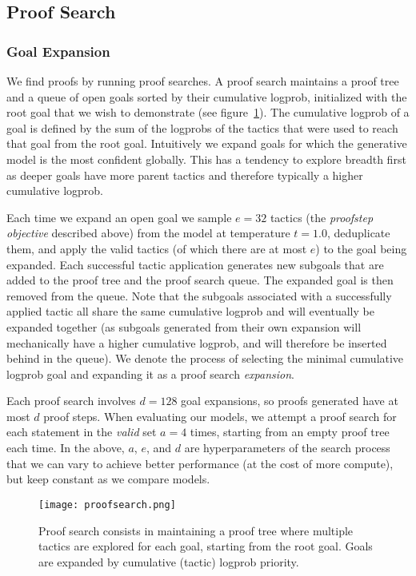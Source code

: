 \documentclass{article}
\begin{document}
\subsection{Proof Search}

\subsubsection{Goal Expansion}
We find proofs by running proof searches. A proof search maintains a proof tree and a queue of open goals sorted by their cumulative logprob, initialized with the root goal that we wish to demonstrate (see figure~\ref{fig:proofsearch}). The cumulative logprob of a goal is defined by the sum of the logprobs of the tactics that were used to reach that goal from the root goal. Intuitively we expand goals for which the generative model is the most confident globally. This has a tendency to explore breadth first as deeper goals have more parent tactics and therefore typically a higher cumulative logprob.

Each time we expand an open goal we sample $e=32$ tactics (the \textit{proofstep objective} described above) from the model at temperature $t=1.0$, deduplicate them, and apply the valid tactics (of which there are at most $e$) to the goal being expanded. Each successful tactic application generates new subgoals that are added to the proof tree and the proof search queue. The expanded goal is then removed from the queue. Note that the subgoals associated with a successfully applied tactic all share the same cumulative logprob and will eventually be expanded together (as subgoals generated from their own expansion will mechanically have a higher cumulative logprob, and will therefore be inserted behind in the queue). We denote the process of selecting the minimal cumulative logprob goal and expanding it as a proof search \textit{expansion}. 

Each proof search involves $d=128$ goal expansions, so proofs generated have at most $d$ proof steps. When evaluating our models, we attempt a proof search for each statement in the \textit{valid} set $a=4$ times, starting from an empty proof tree each time. In the above, $a$, $e$, and $d$ are hyperparameters of the search process that we can vary to achieve better performance (at the cost of more compute), but keep constant as we compare models.

\begin{figure}
    \texttt{[image: proofsearch.png]}
    \caption{Proof search consists in maintaining a proof tree where multiple tactics are explored for each goal, starting from the root goal. Goals are expanded by cumulative (tactic) logprob priority.}
    \label{fig:proofsearch}
\end{figure}
\end{document}
